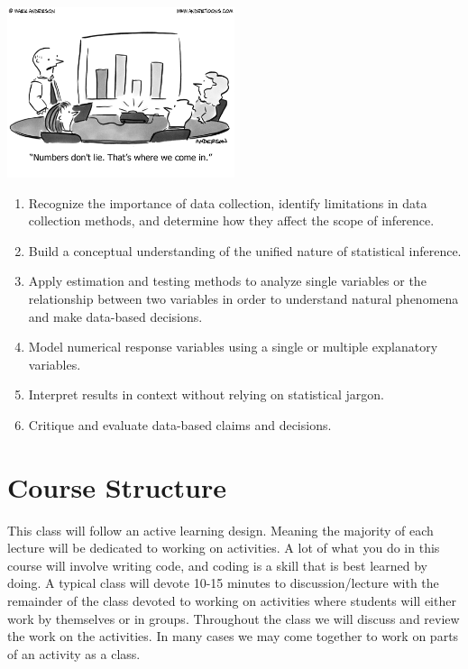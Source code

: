 \documentclass[
  letterpaper,
  DIV=11,
  numbers=noendperiod]{scrreprt}
\providecommand{\tightlist}{%
  \setlength{\itemsep}{0pt}\setlength{\parskip}{0pt}}\usepackage{longtable,booktabs,array}
\begin{document}
\includegraphics[width=0.5\textwidth,height=\textheight]{./images/cartoon3308.png}

\begin{enumerate}
\def\labelenumi{\arabic{enumi}.}
\setcounter{enumi}{2}
\tightlist
\item
  Recognize the importance of data collection, identify limitations in
  data collection methods, and determine how they affect the scope of
  inference.
\item
  Build a conceptual understanding of the unified nature of statistical
  inference.
\item
  Apply estimation and testing methods to analyze single variables or
  the relationship between two variables in order to understand natural
  phenomena and make data-based decisions.
\item
  Model numerical response variables using a single or multiple
  explanatory variables.
\item
  Interpret results in context without relying on statistical jargon.
\item
  Critique and evaluate data-based claims and decisions.
\end{enumerate}

\hypertarget{course-structure}{%
\section*{Course Structure}\label{course-structure}}

This class will follow an active learning design. Meaning the majority
of each lecture will be dedicated to working on activities. A lot of
what you do in this course will involve writing code, and coding is a
skill that is best learned by doing. A typical class will devote 10-15
minutes to discussion/lecture with the remainder of the class devoted to
working on activities where students will either work by themselves or
in groups. Throughout the class we will discuss and review the work on
the activities. In many cases we may come together to work on parts of
an activity as a class.
\end{document}
